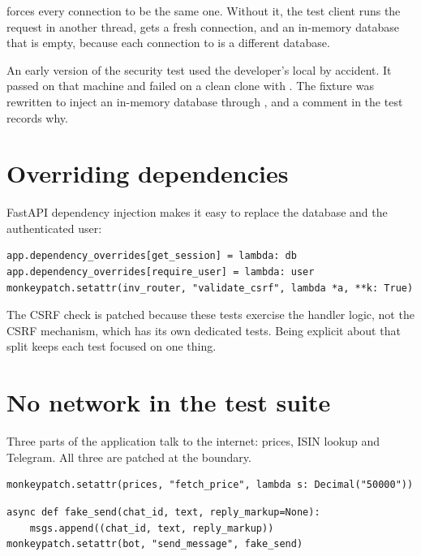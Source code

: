  forces every connection to be the same one. Without it, the
test client runs the request in another thread, gets a fresh connection, and an
in-memory database that is empty, because each connection to
 is a different database.

\begin{keypoint}
An early version of the security test used the developer's local 
by accident. It passed on that machine and failed on a clean clone with
. The fixture was rewritten to inject an in-memory
database through , and a comment in the test records
why.
\end{keypoint}

\section{Overriding dependencies}

FastAPI dependency injection makes it easy to replace the database and the
authenticated user:

\begin{lstlisting}[style=py]
app.dependency_overrides[get_session] = lambda: db
app.dependency_overrides[require_user] = lambda: user
monkeypatch.setattr(inv_router, "validate_csrf", lambda *a, **k: True)
\end{lstlisting}

The CSRF check is patched because these tests exercise the handler logic, not
the CSRF mechanism, which has its own dedicated tests. Being explicit about that
split keeps each test focused on one thing.

\section{No network in the test suite}

Three parts of the application talk to the internet: prices, ISIN lookup and
Telegram. All three are patched at the boundary.

\begin{lstlisting}[style=py]
monkeypatch.setattr(prices, "fetch_price", lambda s: Decimal("50000"))
\end{lstlisting}

\begin{lstlisting}[style=py]
async def fake_send(chat_id, text, reply_markup=None):
    msgs.append((chat_id, text, reply_markup))
monkeypatch.setattr(bot, "send_message", fake_send)
\end{lstlisting}

